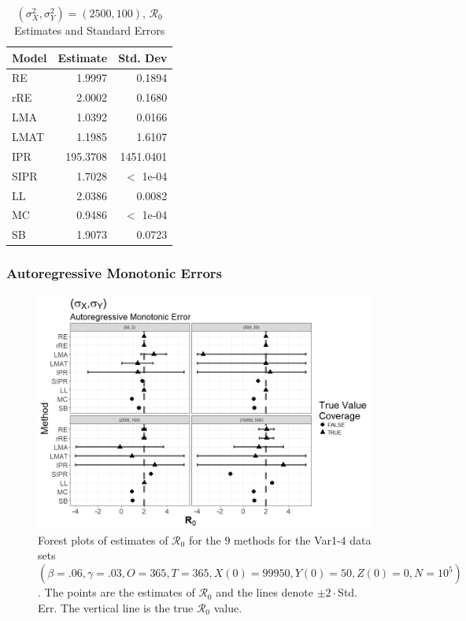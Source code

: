 \documentclass[12pt]{article}
\newcommand{\xxsir}{\ensuremath{9} } %
\newcommand{\rr}{\ensuremath{\mathcal{R}_0}}
\begin{document}
\begin{table}[H]
	
	
	\centering
	\begin{tabular}[t]{l|r|r}
		\hline
		Model & Estimate & Std. Dev\\
		\hline
		RE & 1.9997 & 0.1894\\
		\hline
		rRE & 2.0002 & 0.1680\\
		\hline
		LMA & 1.0392 & 0.0166\\
		\hline
		LMAT & 1.1985 & 1.6107\\
		\hline
		IPR & 195.3708 & 1451.0401\\
		\hline
		SIPR & 1.7028 & $<$ 1e-04\\
		\hline
		LL & 2.0386 & 0.0082\\
		\hline
		MC & 0.9486 & $<$ 1e-04\\
		\hline
		SB & 1.9073 & 0.0723\\
		\hline
	\end{tabular}
	\caption{$(\sigma^2_X, \sigma^2_Y) = (2500, 100)$, $\rr$ Estimates and Standard Errors}
\end{table}

\subsubsection{Autoregressive Monotonic Errors}

\begin{figure}[H]
	\begin{center}
		\includegraphics[scale=0.5]{images/var_arm.jpeg}
		\caption{Forest plots of estimates of $\rr$ for the \xxsir methods for the Var1-4 data sets $(\beta=.06, \gamma=.03, O=365, T=365, X(0)=99950, Y(0)=50, Z(0)=0, N=10^5)$.  The points are the estimates of $\rr$ and the lines denote $\pm 2\cdot $Std. Err.  The vertical line is the true $\rr$ value.}
	\end{center}
\end{figure}
\end{document}
